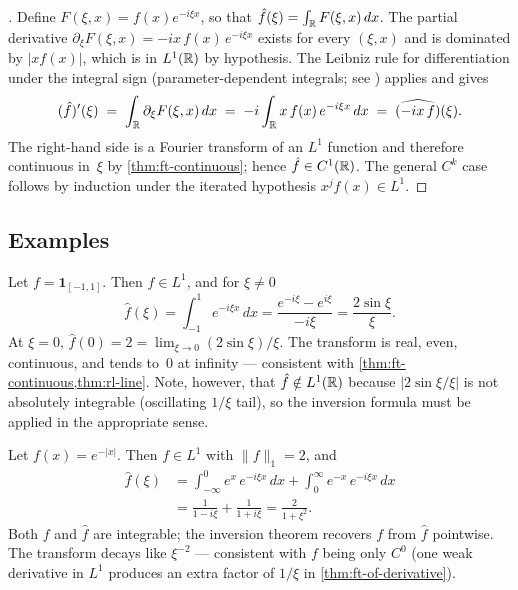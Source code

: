 \begin{proof}[]
Define $F(\xi, x) = f(x) e^{-i \xi x}$, so that
$\hat f(\xi) = \int_{\mathbb{R}} F(\xi, x)\, dx$. The partial derivative
$\partial_\xi F(\xi, x) = -i x\, f(x)\, e^{-i \xi x}$ exists for every
$(\xi, x)$ and is dominated by $|x f(x)|$, which is in $L^1(\mathbb{R})$ by
hypothesis. The Leibniz rule for differentiation under the integral
sign (parameter-dependent integrals; see
\cite[Vol.~II, Ch.~XVII]{Zorich1981}) applies and gives
\[
  (\hat f)'(\xi) \;=\; \int_{\mathbb{R}} \partial_\xi F(\xi, x)\, dx
                 \;=\; -i \int_{\mathbb{R}} x\, f(x)\, e^{-i \xi x}\, dx
                 \;=\; \widehat{(- i x\, f)}(\xi).
\]
The right-hand side is a Fourier transform of an $L^1$ function and
therefore continuous in~$\xi$ by \cref{thm:ft-continuous}; hence
$\hat f \in C^1(\mathbb{R})$. The general $C^k$ case follows by induction
under the iterated hypothesis $x^j f(x) \in L^1$.
\end{proof}

\subsection*{Examples}

\begin{example}
\label{ex:ft-indicator}
Let $f = \mathbf{1}_{[-1, 1]}$. Then $f \in L^1$, and for $\xi \neq 0$
\[
  \hat f(\xi) = \int_{-1}^{1} e^{-i \xi x}\, dx
              = \frac{e^{-i \xi} - e^{i \xi}}{-i\xi}
              = \frac{2 \sin \xi}{\xi}.
\]
At $\xi = 0$, $\hat f(0) = 2 = \lim_{\xi \to 0} (2 \sin \xi)/\xi$.
The transform is real, even, continuous, and tends to~$0$ at infinity
— consistent with \cref{thm:ft-continuous,thm:rl-line}. Note,
however, that $\hat f \notin L^1(\mathbb{R})$ because $|2 \sin \xi / \xi|$ is
not absolutely integrable (oscillating $1/\xi$ tail), so the inversion
formula must be applied in the appropriate sense.
\end{example}

\begin{example}
\label{ex:ft-double-exp}
Let $f(x) = e^{-|x|}$. Then $f \in L^1$ with $\|f\|_1 = 2$, and
\begin{align*}
  \hat f(\xi)
  &= \int_{-\infty}^{0} e^{x}\, e^{-i\xi x}\, dx + \int_{0}^{\infty} e^{-x}\, e^{-i\xi x}\, dx \\
  &= \frac{1}{1 - i\xi} + \frac{1}{1 + i\xi}
   = \frac{2}{1 + \xi^2}.
\end{align*}
Both $f$ and $\hat f$ are integrable; the inversion theorem
recovers $f$ from $\hat f$ pointwise. The transform decays like
$\xi^{-2}$ — consistent with $f$ being only $C^0$ (one weak
derivative in $L^1$ produces an extra factor of $1/\xi$ in
\cref{thm:ft-of-derivative}).
\end{example}

